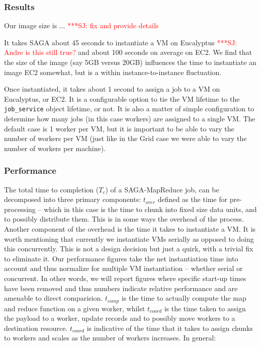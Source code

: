 \documentclass[conference,final]{IEEEtran}
\newcommand{\jhanote}[1]{ {\textcolor{red} { ***SJ: #1 }}}
\newcommand{\jhanote}[1]{}
\newcommand{\sagamapreduce }{SAGA-MapReduce }
\begin{document}
\subsubsection{Results}

Our image size is ... \jhanote{fix and provide details}

It takes SAGA about 45 seconds to instantiate a VM on Eucalyptus
\jhanote{Andre is this still true?}  and about 100 seconds on average
on EC2.  We find that the size of the image (say 5GB versus 20GB)
influences the time to instantiate an image EC2 somewhat, but is a
within instance-to-instance fluctuation.

Once instantiated, it takes about 1 second to assign a job to a VM on
Eucalyptus, or EC2.  It is a configurable option to tie the VM
lifetime to the \texttt{job\_service} object lifetime, or not.  It is
also a matter of simple configuration to determine how many jobs (in
this case workers) are assigned to a single VM. The default case is 1
worker per VM, but it is important to be able to vary the number of
workers per VM (just like in the Grid case we were able to vary the
number of workers per machine). 


\subsubsection{Performance} The total time to completion ($T_c$) of a
\sagamapreduce job, can be decomposed into three primary components:
$t_{over}$ defined as the time for pre-processing -- which in this case
is the time to chunk into fixed size data units, and to possibly
distribute them. This is in some ways the overhead of the process.
Another component of the overhead is the time it takes to instantiate
a VM. It is worth mentioning that currently we instantiate VMs
serially as opposed to doing this concurrently. This is not a design
decision but just a quirk, with a trivial fix to eliminate it.  Our
performance figures take the net instantiation time into account and
thus normalize for multiple VM instantiation -- whether serial or
concurrent. In other words, we will report figures where specific
start-up times have been removed and thus numbers indicate relative
performance and are amenable to direct comparision.  $t_{comp}$ is the
time to actually compute the map and reduce function on a given
worker, whilst $t_{coord}$ is the time taken to assign the payload to
a worker, update records and to possibly move workers to a destination
resource. $t_{coord}$ is indicative of the time that it takes to
assign chunks to workers and scales as the number of workers
increases. In general:
\end{document}
